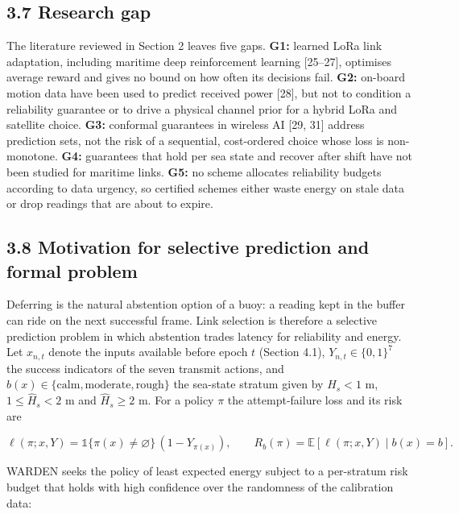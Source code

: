 \documentclass[
  11pt,
]{article}
\begin{document}
\hypertarget{research-gap}{%
\subsection{3.7 Research gap}\label{research-gap}}

The literature reviewed in Section 2 leaves five gaps. \textbf{G1:}
learned LoRa link adaptation, including maritime deep reinforcement
learning {[}25--27{]}, optimises average reward and gives no bound on
how often its decisions fail. \textbf{G2:} on-board motion data have
been used to predict received power {[}28{]}, but not to condition a
reliability guarantee or to drive a physical channel prior for a hybrid
LoRa and satellite choice. \textbf{G3:} conformal guarantees in wireless
AI {[}29, 31{]} address prediction sets, not the risk of a sequential,
cost-ordered choice whose loss is non-monotone. \textbf{G4:} guarantees
that hold per sea state and recover after shift have not been studied
for maritime links. \textbf{G5:} no scheme allocates reliability budgets
according to data urgency, so certified schemes either waste energy on
stale data or drop readings that are about to expire.

\hypertarget{motivation-for-selective-prediction-and-formal-problem}{%
\subsection{3.8 Motivation for selective prediction and formal
problem}\label{motivation-for-selective-prediction-and-formal-problem}}

Deferring is the natural abstention option of a buoy: a reading kept in
the buffer can ride on the next successful frame. Link selection is
therefore a selective prediction problem in which abstention trades
latency for reliability and energy. Let \(x_{n,t}\) denote the inputs
available before epoch \(t\) (Section 4.1), \(Y_{n,t}\in\{0,1\}^{7}\)
the success indicators of the seven transmit actions, and
\(b(x)\in\{\text{calm},\text{moderate},\text{rough}\}\) the sea-state
stratum given by \(\hat H_s<1\) m, \(1\le\hat H_s<2\) m and
\(\hat H_s\ge 2\) m. For a policy \(\pi\) the attempt-failure loss and
its risk are

\[\ell(\pi;x,Y)=\mathbb{1}\{\pi(x)\ne\varnothing\}\,\left(1-Y_{\pi(x)}\right),\qquad R_b(\pi)=\mathbb{E}\left[\ell(\pi;x,Y)\mid b(x)=b\right]. \tag{12}\]

WARDEN seeks the policy of least expected energy subject to a
per-stratum risk budget that holds with high confidence over the
randomness of the calibration data:
\end{document}
